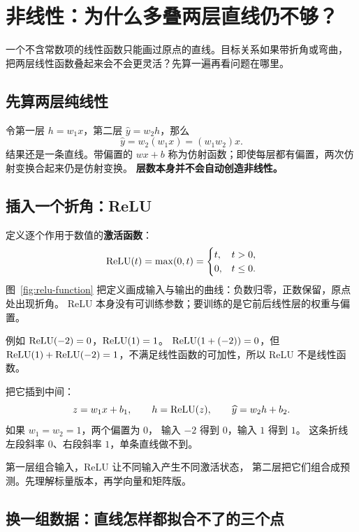 \chapterrule
\section{非线性：为什么多叠两层直线仍不够？}
\label{intro:nonlinearity}

一个不含常数项的线性函数只能画过原点的直线。目标关系如果带折角或弯曲，
把两层线性函数叠起来会不会更灵活？先算一遍再看问题在哪里。

\subsection{先算两层纯线性}

令第一层 $h=w_1x$，第二层 $\widehat{y}=w_2h$，那么
\[
\widehat{y}=w_2(w_1x)=(w_1w_2)x.
\]
结果还是一条直线。带偏置的 $wx+b$ 称为仿射函数；即使每层都有偏置，两次仿射变换合起来仍是仿射变换。
\textbf{层数本身并不会自动创造非线性。}

\subsection{插入一个折角：ReLU}
\label{sec:relu-piecewise}

定义逐个作用于数值的\textbf{激活函数}：
\begin{equation}
\operatorname{ReLU}(t)=\max(0,t)=
\begin{cases}t,&t>0,\\0,&t\le0.\end{cases}
\end{equation}
图~\ref{fig:relu-function} 把定义画成输入与输出的曲线：负数归零，正数保留，原点处出现折角。
ReLU 本身没有可训练参数；要训练的是它前后线性层的权重与偏置。


例如 $\operatorname{ReLU}(-2)=0$，$\operatorname{ReLU}(1)=1$。
$\operatorname{ReLU}(1+(-2))=0$，但
$\operatorname{ReLU}(1)+\operatorname{ReLU}(-2)=1$，不满足线性函数的可加性，所以 ReLU 不是线性函数。

把它插到中间：
\[
z=w_1x+b_1,\qquad h=\operatorname{ReLU}(z),\qquad
\widehat{y}=w_2h+b_2.
\]
如果 $w_1=w_2=1$，两个偏置为 $0$，
输入 $-2$ 得到 $0$，输入 $1$ 得到 $1$。
这条折线左段斜率 $0$、右段斜率 $1$，单条直线做不到。

\begin{idea}
第一层组合输入，ReLU 让不同输入产生不同激活状态，
第二层把它们组合成预测。先理解标量版本，再学向量和矩阵版。
\end{idea}

\subsection{换一组数据：直线怎样都拟合不了的三个点}
\label{experiment:relu-fit}

